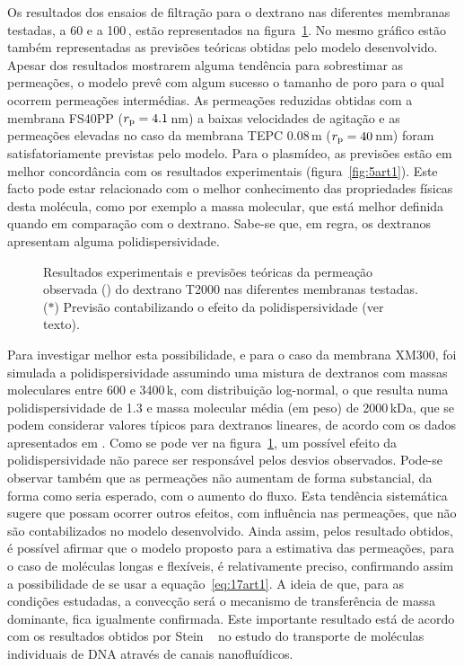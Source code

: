 Os resultados dos ensaios de filtração para o dextrano nas diferentes membranas testadas, a 60 e a 100\,\minmum, estão representados na figura~\ref{fig:4art1}. No mesmo gráfico estão também representadas as previsões teóricas obtidas pelo modelo desenvolvido. Apesar dos resultados mostrarem alguma tendência para sobrestimar as permeações, o modelo prevê com algum sucesso o tamanho de poro para o qual ocorrem permeações intermédias. As permeações reduzidas obtidas com a membrana FS40PP ($r_{\mathrm{p}}=4.1$\,nm) a baixas velocidades de agitação e as permeações elevadas no caso da membrana TEPC 0.08\,\micro m ($r_{\mathrm{p}}=40$\,nm) foram satisfatoriamente previstas pelo modelo.
%
%
Para o plasmídeo, as previsões estão em melhor concordância com os resultados experimentais (figura~\ref{fig:5art1}). Este facto pode estar relacionado com o melhor conhecimento das propriedades físicas desta molécula, como por exemplo a massa molecular, que está melhor definida quando em comparação com o dextrano. Sabe-se que, em regra, os dextranos apresentam alguma polidispersividade.
%
\begin{figure}[!t]
	\centering
	
	\caption[Permeação observada do dextrano T2000 nas diferentes membranas testadas]{Resultados experimentais e previsões teóricas da permeação observada (\permobs) do dextrano T2000 nas diferentes membranas testadas. ($\ast$) Previsão contabilizando o efeito da polidispersividade (ver texto).}
	\label{fig:4art1}
\end{figure}
Para investigar melhor esta possibilidade, e para o caso da membrana XM300, foi simulada a polidispersividade assumindo uma mistura de dextranos com massas moleculares entre 600 e 3400\,k\daltons, com distribuição log-normal, o que resulta numa polidispersividade de 1.3 e massa molecular média (em peso) de 2000\,kDa, que se podem considerar valores típicos para dextranos lineares, de acordo com os dados apresentados em \cite{lechner}.
%
Como se pode ver na figura~\ref{fig:4art1}, um possível efeito da polidispersividade não parece ser responsável pelos desvios observados. Pode-se observar também que as permeações não aumentam de forma substancial, da forma como seria esperado, com o aumento do fluxo. Esta tendência sistemática sugere que possam ocorrer outros efeitos, com influência nas permeações, que não são contabilizados no modelo desenvolvido. Ainda assim, pelos resultado obtidos, é possível afirmar que o modelo proposto para a estimativa das permeações, para o caso de moléculas longas e flexíveis, é relativamente preciso, confirmando assim a possibilidade de se usar a equação~\ref{eq:17art1}. A ideia de que, para as condições estudadas, a convecção será o mecanismo de transferência de massa dominante, fica igualmente confirmada. Este importante resultado está de acordo com os resultados obtidos por Stein \et\ \cite{stein} no estudo do transporte de moléculas individuais de DNA através de canais nanofluídicos.
